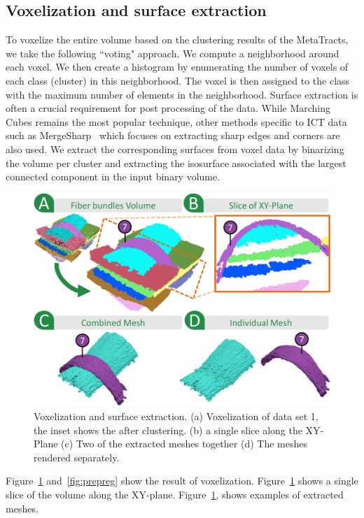 \subsection{Voxelization and surface extraction}
To voxelize the entire volume based on the clustering results of the MetaTracts, we take the following ``voting" approach.
We compute a neighborhood around each voxel. We then create a histogram by  enumerating the number of voxels of each class (cluster) in this neighborhood. The voxel is then assigned to the class with the maximum number of elements in the neighborhood. 
Surface extraction is often a crucial requirement for post processing of the data. While Marching Cubes\cite{Lorensen1987} remains the most popular technique, other methods specific to ICT data such as MergeSharp~\cite{Bhattacharya2013} which focuses on extracting sharp edges and corners are also used.  
We extract the corresponding surfaces from voxel data by binarizing the volume per cluster and extracting the isosurface associated with the largest connected component in the input binary volume. 
\begin{figure}[htb]
	\centering
	\includegraphics[width=\linewidth]{images/figure8.eps} 
	\caption{Voxelization and surface extraction. (a) Voxelization of data set 1, the inset shows the \mt after clustering. (b) a single slice along the XY-Plane (c) Two of the extracted meshes together (d) The meshes rendered separately.}
	\label{fig:crop-16-decomp}
\end{figure} 
Figure~\ref{fig:crop-16-decomp} and~\ref{fig:prepreg} show the result of voxelization. Figure~\ref{fig:crop-16-decomp} shows a single slice of the volume along the XY-plane. Figure~\ref{fig:crop-16-decomp}, shows examples of extracted meshes.


